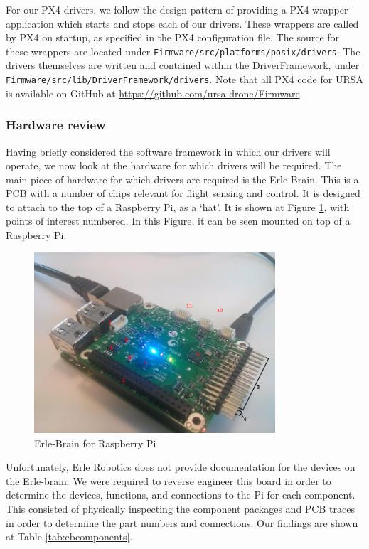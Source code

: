 \documentclass[capstone_report.tex]{subfiles}
\begin{document}
    For our PX4 drivers, we follow the design pattern of providing a PX4 wrapper application which starts and stops each of our drivers. These wrappers are called by PX4 on startup, as specified in the PX4 configuration file. The source for these wrappers are located under \texttt{Firmware/src/platforms/posix/drivers}. The drivers themselves are written and contained within the DriverFramework, under \texttt{Firmware/src/lib/DriverFramework/drivers}. Note that all PX4 code for URSA is available on GitHub at \url{https://github.com/ursa-drone/Firmware}.

    \subsubsection{Hardware review}
    Having briefly considered the software framework in which our drivers will operate, we now look at the hardware for which drivers will be required. The main piece of hardware for which drivers are required is the Erle-Brain. This is a PCB with a number of chips relevant for flight sensing and control. It is designed to attach to the top of a Raspberry Pi, as a `hat'. It is shown at Figure \ref{fig:erleHat}, with points of interest numbered. In this Figure, it can be seen mounted on top of a Raspberry Pi.

    \begin{figure}[H]
        \centering
        \includegraphics[width=0.8\textwidth]{imgs/erleHat.jpg}
        \caption{Erle-Brain for Raspberry Pi\label{fig:erleHat}}
    \end{figure}


    Unfortunately, Erle Robotics does not provide documentation for the devices on the Erle-brain. We were required to reverse engineer this board in order to determine the devices, functions, and connections to the Pi for each component. This consisted of physically inspecting the component packages and PCB traces in order to determine the part numbers and connections. Our findings are shown at Table \ref{tab:ebcomponents}.
\end{document}
